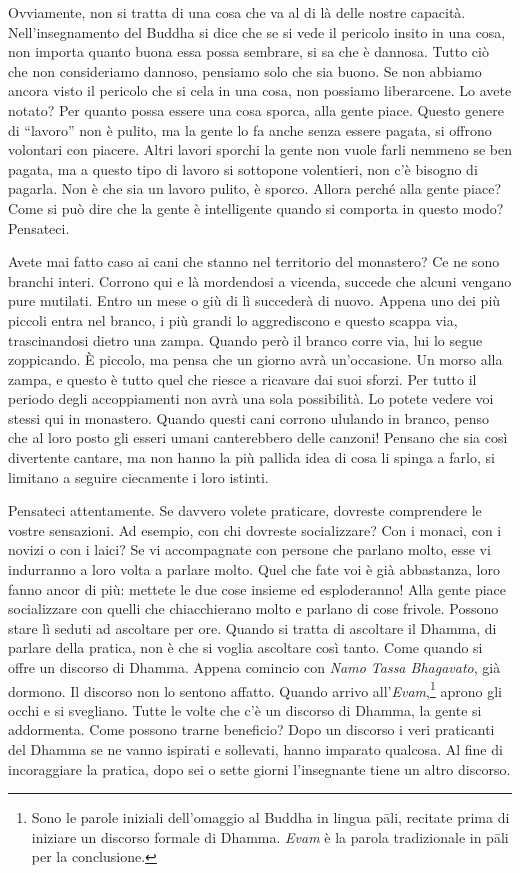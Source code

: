 Ovviamente, non si tratta di una cosa che va al di là delle nostre
capacità. Nell'insegnamento del Buddha si dice che se si vede il
pericolo insito in una cosa, non importa quanto buona essa possa
sembrare, si sa che è dannosa. Tutto ciò che non consideriamo dannoso,
pensiamo solo che sia buono. Se non abbiamo ancora visto il pericolo che
si cela in una cosa, non possiamo liberarcene. Lo avete notato? Per
quanto possa essere una cosa sporca, alla gente piace. Questo genere di
``lavoro'' non è pulito, ma la gente lo fa anche senza essere pagata, si
offrono volontari con piacere. Altri lavori sporchi la gente non vuole
farli nemmeno se ben pagata, ma a questo tipo di lavoro si sottopone
volentieri, non c'è bisogno di pagarla. Non è che sia un lavoro pulito,
è sporco. Allora perché alla gente piace? Come si può dire che la gente
è intelligente quando si comporta in questo modo? Pensateci.

Avete mai fatto caso ai cani che stanno nel territorio del monastero? Ce
ne sono branchi interi. Corrono qui e là mordendosi a vicenda, succede
che alcuni vengano pure mutilati. Entro un mese o giù di lì succederà di
nuovo. Appena uno dei più piccoli entra nel branco, i più grandi lo
aggrediscono e questo scappa via, trascinandosi dietro una zampa. Quando
però il branco corre via, lui lo segue zoppicando. È piccolo, ma pensa
che un giorno avrà un'occasione. Un morso alla zampa, e questo è tutto
quel che riesce a ricavare dai suoi sforzi. Per tutto il periodo degli
accoppiamenti non avrà una sola possibilità. Lo potete vedere voi stessi
qui in monastero. Quando questi cani corrono ululando in branco, penso
che al loro posto gli esseri umani canterebbero delle canzoni! Pensano
che sia così divertente cantare, ma non hanno la più pallida idea di
cosa li spinga a farlo, si limitano a seguire ciecamente i loro istinti.

Pensateci attentamente. Se davvero volete praticare, dovreste
comprendere le vostre sensazioni. Ad esempio, con chi dovreste
socializzare? Con i monaci, con i novizi o con i laici? Se vi
accompagnate con persone che parlano molto, esse vi indurranno a loro
volta a parlare molto. Quel che fate voi è già abbastanza, loro fanno
ancor di più: mettete le due cose insieme ed esploderanno! Alla gente
piace socializzare con quelli che chiacchierano molto e parlano di cose
frivole. Possono stare lì seduti ad ascoltare per ore. Quando si tratta
di ascoltare il Dhamma, di parlare della pratica, non è che si voglia
ascoltare così tanto. Come quando si offre un discorso di Dhamma. Appena
comincio con \emph{Namo Tassa Bhagavato}, già dormono. Il discorso non
lo sentono affatto. Quando arrivo all'\emph{Evam},\footnote{Sono le
  parole iniziali dell'omaggio al Buddha in lingua pāli, recitate prima
  di iniziare un discorso formale di Dhamma. \emph{Evam} è la parola
  tradizionale in pāli per la conclusione.} aprono gli occhi e si
svegliano. Tutte le volte che c'è un discorso di Dhamma, la gente si
addormenta. Come possono trarne beneficio? Dopo un discorso i veri
praticanti del Dhamma se ne vanno ispirati e sollevati, hanno imparato
qualcosa. Al fine di incoraggiare la pratica, dopo sei o sette giorni
l'insegnante tiene un altro discorso.

